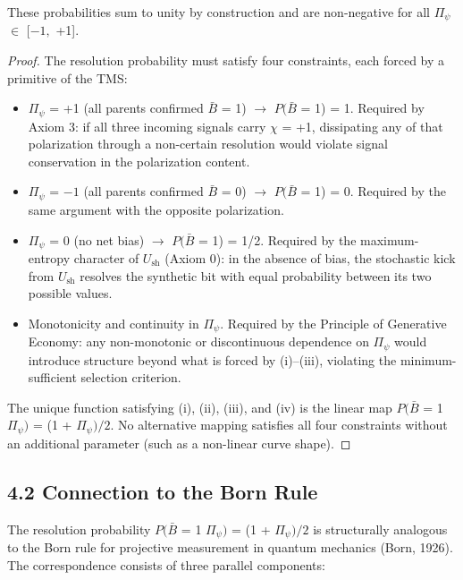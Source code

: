 \documentclass[11pt,oneside]{report}
\theoremstyle{definition}
\theoremstyle{remark}
\begin{document}
These probabilities sum to unity by construction and are non-negative
for all \ensuremath{\Pi_{\psi}} \ensuremath{\in} \ensuremath{[-1,} +1].

\begin{proof}
The resolution probability must satisfy four constraints, each
forced by a primitive of the TMS:

\begin{itemize}
\item
  \ensuremath{\Pi_{\psi}} = +1 (all parents confirmed \ensuremath{\bar{B}} = 1) \ensuremath{\to} \ensuremath{P(\bar{B}} = 1) = 1. Required by
  Axiom 3: if all three incoming signals carry \ensuremath{\chi} = +1, dissipating any
  of that polarization through a non-certain resolution would violate
  signal conservation in the polarization content.
\item
  \ensuremath{\Pi_{\psi}} = \ensuremath{-1} (all parents confirmed \ensuremath{\bar{B}} = 0) \ensuremath{\to} \ensuremath{P(\bar{B}} = 1) = 0. Required by
  the same argument with the opposite polarization.
\item
  \ensuremath{\Pi_{\psi}} = 0 (no net bias) \ensuremath{\to} \ensuremath{P(\bar{B}} = 1) = 1/2. Required by the
  maximum-entropy character of \ensuremath{U_{\mathrm{sh}}} (Axiom 0): in the absence of bias,
  the stochastic kick from \ensuremath{U_{\mathrm{sh}}} resolves the synthetic bit with equal
  probability between its two possible values.
\item
  Monotonicity and continuity in \ensuremath{\Pi_{\psi}.} Required by the Principle of
  Generative Economy: any non-monotonic or discontinuous dependence on
  \ensuremath{\Pi_{\psi}} would introduce structure beyond what is forced by (i)--(iii),
  violating the minimum-sufficient selection criterion.
\end{itemize}

The unique function satisfying (i), (ii), (iii), and (iv) is the linear
map \ensuremath{P(\bar{B}} = 1 \textbar{} \ensuremath{\Pi_{\psi})} = (1 + \ensuremath{\Pi_{\psi})/2.} No alternative mapping
satisfies all four constraints without an additional parameter (such as
a non-linear curve shape).

\end{proof}

\subsection*{4.2 Connection to the Born Rule}

The resolution probability \ensuremath{P(\bar{B}} = 1 \textbar{} \ensuremath{\Pi_{\psi})} = (1 + \ensuremath{\Pi_{\psi})/2} is
structurally analogous to the Born rule for projective measurement in
quantum mechanics (Born, 1926). The correspondence consists of three
parallel components:
\end{document}
